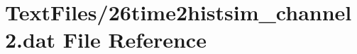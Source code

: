\hypertarget{26time2histsim__channel2_8dat}{}\section{Text\+Files/26time2histsim\+\_\+channel2.dat File Reference}
\label{26time2histsim__channel2_8dat}
